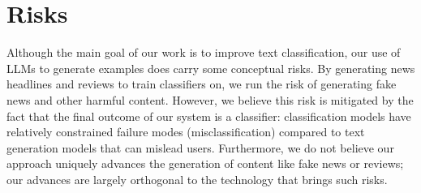 \section{Risks}

Although the main goal of our work is to improve text classification, our use of LLMs to generate examples does carry some conceptual risks. By generating news headlines and reviews to train classifiers on, we run the risk of generating fake news and other harmful content. However, we believe this risk is mitigated by the fact that the final outcome of our system is a classifier: classification models have relatively constrained failure modes (misclassification) compared to text generation models that can mislead users. Furthermore, we do not believe our approach uniquely advances the generation of content like fake news or reviews; our advances are largely orthogonal to the technology that brings such risks.
